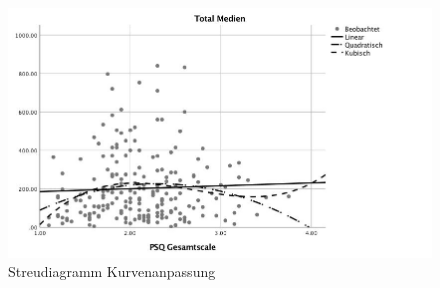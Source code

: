 \begin{figure}[h]
  \centering
     \includegraphics[scale=0.4]{content/Grafik/Streudiagramm_Hypo2_Kurvenanpassung.jpg}
  \captionsetup{margin=80pt}
  \caption{Streudiagramm Kurvenanpassung}
  \label{fig:AppHypo2StreudiagrammKurvenanpassung}
\end{figure}